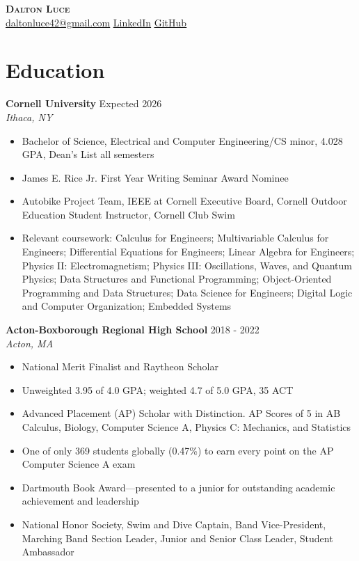 \documentclass[letterpaper,8pt]{article}
\newcommand{\resumeEntry}[4]{
    \vspace{4pt}
    \large \textbf{#1}
    \normalsize \hfill #2
    \\
    \textit{#3} \hfill \textit{#4}
    \vspace{1pt}
}
\newcommand{\itemsBegin}{
    \begin{itemize}[leftmargin=0.2in, labelsep=0.05in, itemsep=0pt, parsep=1pt, topsep=0pt, partopsep=0pt]
}
\newcommand{\itemsEnd}{\end{itemize}}
\begin{document}
\textbf{\huge \scshape Dalton Luce} \\
\vspace{2pt}
\small
\addressConditional
\phoneConditional
\href{mailto:daltonluce42@gmail.com}{\underline{daltonluce42@gmail.com}}
\hspace{10pt}
\href{https://www.linkedin.com/in/dalton-luce/}{\underline{LinkedIn}}
\hspace{10pt}
\href{https://github.com/da-luce}{\underline{GitHub}}
\vspace{-5pt}

\section{Education}

    \resumeEntry
        {Cornell University}
        {Expected 2026}
        {}
        {Ithaca, NY}

    \itemsBegin
        \item Bachelor of Science, Electrical and Computer Engineering/CS minor, 4.028 GPA, Dean’s List all semesters
        \item James E. Rice Jr. First Year Writing Seminar Award Nominee
        \item Autobike Project Team, IEEE at Cornell Executive Board, Cornell Outdoor Education Student Instructor, Cornell Club Swim
        \item Relevant coursework: Calculus for Engineers; Multivariable Calculus for Engineers; Differential Equations for Engineers; Linear Algebra for Engineers; Physics II: Electromagnetism; Physics III: Oscillations, Waves, and Quantum Physics; Data Structures and Functional Programming; Object-Oriented Programming and Data Structures; Data Science for Engineers; Digital Logic and Computer Organization; Embedded Systems
    \itemsEnd

    \resumeEntry
        {Acton-Boxborough Regional High School}
        {2018 - 2022}
        {}
        {Acton, MA}

    \itemsBegin
        \item National Merit Finalist and Raytheon Scholar
        \item Unweighted 3.95 of 4.0 GPA; weighted 4.7 of 5.0 GPA, 35 ACT
        \item Advanced Placement (AP) Scholar with Distinction. AP Scores of 5 in AB Calculus, Biology, Computer Science A, Physics C: Mechanics, and Statistics
        \item One of only 369 students globally (0.47\%) to earn every point on the AP Computer Science A exam
        \item Dartmouth Book Award—presented to a junior for outstanding academic achievement and leadership
        \item National Honor Society, Swim and Dive Captain, Band Vice-President, Marching Band Section Leader, Junior and Senior Class Leader, Student Ambassador
    \itemsEnd
\end{document}
